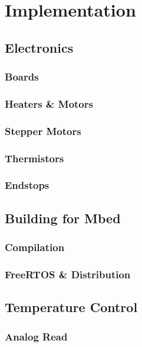 \chapter{Implementation}
	
	\section{Electronics}
		
		\subsection{Boards}
		
		\subsection{Heaters \& Motors}
		
		\subsection{Stepper Motors}
		
		\subsection{Thermistors}
		
		\subsection{Endstops}
	
	\section{Building for Mbed}
		
		\subsection{Compilation}
		
		\subsection{FreeRTOS \& \uIP{} Distribution}
	
	\section{Temperature Control}
		
		\subsection{Analog Read}
		
